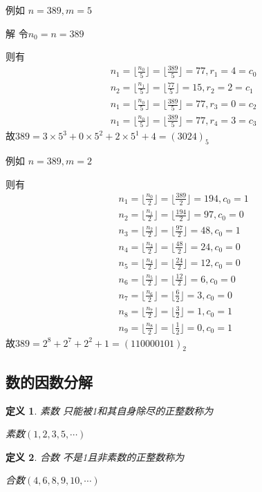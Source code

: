 \documentclass[UTF8]{ctexart}
\newtheorem{definition}{\hspace{2em}定义}[section]
\begin{document}
\begin{enumerate}
        例如 $n=389, m=5$

        解 令$n_0=n=389$

        则有
        $$
        \begin{aligned}
            &n_1=\lfloor \frac{n_0}{5} \rfloor=\lfloor \frac{389}{5} \rfloor=77, r_1=4=c_0\\
            &n_2=\lfloor \frac{n_1}{5} \rfloor=\lfloor \frac{77}{5} \rfloor=15, r_2=2=c_1\\
            &n_1=\lfloor \frac{n_0}{5} \rfloor=\lfloor \frac{389}{5} \rfloor=77, r_3=0=c_2\\
            &n_1=\lfloor \frac{n_0}{5} \rfloor=\lfloor \frac{389}{5} \rfloor=77, r_4=3=c_3
        \end{aligned}
        $$
        故$389=3\times 5^3+0\times 5^2+2\times 5^1+4=(3024)_5$

        例如 $n=389, m=2$

        则有
        $$
        \begin{aligned}
            &n_1=\lfloor \frac{n_0}{2} \rfloor=\lfloor \frac{389}{2} \rfloor=194, c_0=1\\
            &n_2=\lfloor \frac{n_1}{2} \rfloor=\lfloor \frac{194}{2} \rfloor=97, c_0=0\\
            &n_3=\lfloor \frac{n_2}{2} \rfloor=\lfloor \frac{97}{2} \rfloor=48, c_0=1\\
            &n_4=\lfloor \frac{n_3}{2} \rfloor=\lfloor \frac{48}{2} \rfloor=24, c_0=0\\
            &n_5=\lfloor \frac{n_4}{2} \rfloor=\lfloor \frac{24}{2} \rfloor=12, c_0=0\\
            &n_6=\lfloor \frac{n_5}{2} \rfloor=\lfloor \frac{12}{2} \rfloor=6, c_0=0\\
            &n_7=\lfloor \frac{n_6}{2} \rfloor=\lfloor \frac{6}{2} \rfloor=3, c_0=0\\
            &n_8=\lfloor \frac{n_7}{2} \rfloor=\lfloor \frac{3}{2} \rfloor=1, c_0=1\\
            &n_9=\lfloor \frac{n_8}{2} \rfloor=\lfloor \frac{1}{2} \rfloor=0, c_0=1
        \end{aligned}
        $$
        故$389=2^8+2^7+2^2+1=(110000101)_2$
    \end{enumerate}

    \subsection{数的因数分解}
    \begin{definition}{素数}
        只能被1和其自身除尽的正整数称为

        素数$(1, 2, 3, 5, \cdots)$
    \end{definition}
    \begin{definition}{合数}
        不是1且非素数的正整数称为

        合数$(4, 6, 8, 9, 10, \cdots)$

    \end{definition}
\end{document}
